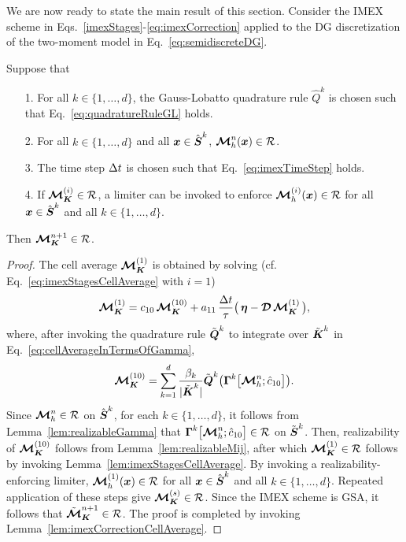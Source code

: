 We are now ready to state the main result of this section.  
Consider the IMEX scheme in Eqs.~\eqref{imexStages}-\eqref{eq:imexCorrection} applied to the DG discretization of the two-moment model in Eq.~\eqref{eq:semidiscreteDG}.  
\begin{theorem}
  Suppose that
  \begin{itemize}
    \item[1.] For all $k\in\{1,\ldots,d\}$, the Gauss-Lobatto quadrature rule $\hat{Q}^{k}$ is chosen such that Eq.~\eqref{eq:quadratureRuleGL} holds.  
    \item[2.] For all $k\in\{1,\ldots,d\}$ and all $\boldsymbol{x}\in\hat{\boldsymbol{S}}^{k}$, $\boldsymbol{\mathcal{M}}_{h}^{n}(\boldsymbol{x})\in\mathcal{R}$.
    \item[3.] The time step $\Delta t$ is chosen such that Eq.~\eqref{eq:imexTimeStep} holds.  
    \item[4.] If $\boldsymbol{\mathcal{M}}_{\boldsymbol{K}}^{(i)}\in\mathcal{R}$, a limiter can be invoked to enforce $\boldsymbol{\mathcal{M}}_{h}^{(i)}(\boldsymbol{x})\in\mathcal{R}$ for all $\boldsymbol{x}\in\hat{\boldsymbol{S}}^{k}$ and all $k\in\{1,\ldots,d\}$.
  \end{itemize}
  Then $\boldsymbol{\mathcal{M}}_{\boldsymbol{K}}^{n+1}\in\mathcal{R}$.  
  \label{the:realizableDGIMEX}
\end{theorem}
\begin{proof}
  The cell average $\boldsymbol{\mathcal{M}}_{\boldsymbol{K}}^{(1)}$ is obtained by solving (cf. Eq.~\eqref{eq:imexStagesCellAverage} with $i=1$)
  \begin{equation*}
    \boldsymbol{\mathcal{M}}_{\boldsymbol{K}}^{(1)}=c_{10}\,\boldsymbol{\mathcal{M}}_{\boldsymbol{K}}^{(10)}+a_{11}\,\frac{\Delta t}{\tau}\big(\,\boldsymbol{\eta}-\boldsymbol{\mathcal{D}}\,\boldsymbol{\mathcal{M}}_{\boldsymbol{K}}^{(1)}\,\big),
  \end{equation*}
  where, after invoking the quadrature rule $\tilde{\boldsymbol{Q}}^{k}$ to integrate over $\tilde{\boldsymbol{K}}^{k}$ in Eq.~\eqref{eq:cellAverageInTermsOfGamma},
  \begin{equation*}
    \boldsymbol{\mathcal{M}}_{\boldsymbol{K}}^{(10)}
    =\sum_{k=1}^{d}\frac{\beta_{k}}{|\tilde{\boldsymbol{K}}^{k}|}\tilde{\boldsymbol{Q}}^{k}\big(\boldsymbol{\Gamma}^{k}\big[\boldsymbol{\mathcal{M}}_{h}^{n};\hat{c}_{10}\big]\big).  
  \end{equation*}
  Since $\boldsymbol{\mathcal{M}}_{h}^{n}\in\mathcal{R}$ on $\hat{\boldsymbol{S}}^{k}$, for each $k\in\{1,\ldots,d\}$, it follows from Lemma~\ref{lem:realizableGamma} that $\boldsymbol{\Gamma}^{k}\big[\boldsymbol{\mathcal{M}}_{h}^{n};\hat{c}_{10}\big]\in\mathcal{R}$ on $\tilde{\boldsymbol{S}}^{k}$.  
  Then, realizability of $\boldsymbol{\mathcal{M}}_{\boldsymbol{K}}^{(10)}$ follows from Lemma~\ref{lem:realizableMij}, after which $\boldsymbol{\mathcal{M}}_{\boldsymbol{K}}^{(1)}\in\mathcal{R}$ follows by invoking Lemma~\ref{lem:imexStagesCellAverage}.  
  By invoking a realizability-enforcing limiter, $\boldsymbol{\mathcal{M}}_{h}^{(1)}(\boldsymbol{x})\in\mathcal{R}$ for all $\boldsymbol{x}\in\hat{\boldsymbol{S}}^{k}$ and all $k\in\{1,\ldots,d\}$.  
  Repeated application of these steps give $\boldsymbol{\mathcal{M}}_{\boldsymbol{K}}^{(s)}\in\mathcal{R}$.  
  Since the IMEX scheme is GSA, it follows that $\tilde{\boldsymbol{\mathcal{M}}}_{\boldsymbol{K}}^{n+1}\in\mathcal{R}$.  
  The proof is completed by invoking Lemma~\ref{lem:imexCorrectionCellAverage}.  
\end{proof}
